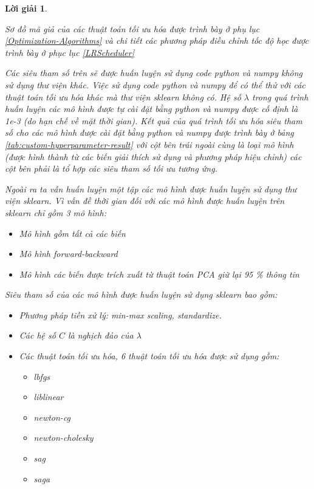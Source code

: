 \documentclass[14pt, a4paper]{article}
\theoremstyle{sltheorem}
\theoremstyle{soltheorem}
\newtheorem*{loigiai}{Lời giải}
\begin{document}
\begin{loigiai}
\begin{itemize}
        Sơ đồ mã giả của các thuật toán tối ưu hóa được trình bày ở phụ lục \ref{Optimization-Algorithms} và chi tiết các phương pháp điều chỉnh tốc độ học được trình bày ở phục lục \ref{LRScheduler}
    \end{itemize}

    Các siêu tham số trên sẽ được huấn luyện sử dụng code python và numpy không sử dụng thư viện khác.
    Việc sử dụng code python và numpy để có thể thử với các thuật toán tối ưu hóa khác mà thư viện sklearn không có.
    Hệ số $\lambda$ trong quá trình huấn luyện các mô hình được tự cài đặt bằng python và numpy được cố định là 1e-3 (do hạn chế về mặt thời gian).
    Kết quả của quá trình tối ưu hóa siêu tham số cho các mô hình được cài đặt bằng python và numpy được trình bày ở bảng \ref{tab:custom-hyperparameter-result} với cột bên trái ngoài cùng là loại mô hình (được hình thành từ các biến giải thích sử dụng và phương pháp hiệu chỉnh) các cột bên phải là tổ hợp các siêu tham số tối ưu tương ứng.

    Ngoài ra ta vẫn huấn luyện một tập các mô hình được huấn luyện sử dụng thư viện sklearn.
    Vì vấn đề thời gian đối với các mô hình được huấn luyện trên sklearn chỉ gồm 3 mô hình:
    \begin{itemize}
        \item Mô hình gồm tất cả các biến
        \item Mô hình forward-backward
        \item Mô hình các biến được trích xuất từ thuật toán PCA giữ lại 95 \% thông tin
    \end{itemize}
    Siêu tham số của các mô hình được huấn luyện sử dụng sklearn bao gồm:

    \begin{itemize}
        \item Phương pháp tiền xử lý: min-max scaling, standardize.
        \item Các hệ số $C$ là nghịch đảo của $\lambda$
        \item Các thuật toán tối ưu hóa, 6 thuật toán tối ưu hóa được sử dụng gồm:
        \begin{itemize}
            \item lbfgs
            \item liblinear
            \item newton-cg 
            \item newton-cholesky
            \item sag 
            \item saga
        \end{itemize}
    \end{itemize}


\end{loigiai}
\end{document}
